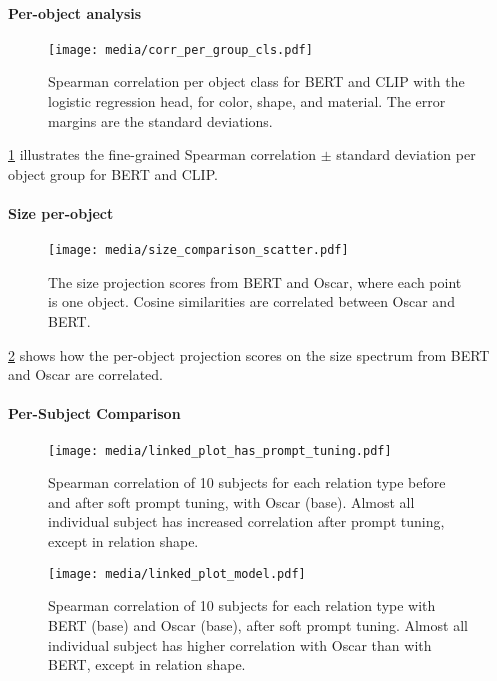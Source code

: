 \documentclass[11pt]{article}
\begin{document}
\paragraph{Per-object analysis}

\begin{figure}[ht]
    \centering
    \texttt{[image: media/corr\_per\_group\_cls.pdf]}
    \caption{Spearman correlation per object class for BERT and CLIP with the logistic regression head, for color, shape, and material. The error margins are the standard deviations.}
    \label{fig:logsitic_reg_fig}
\end{figure}

\cref{fig:logsitic_reg_fig} illustrates the fine-grained Spearman correlation $\pm$ standard deviation per object group for BERT and CLIP.

\paragraph{Size per-object}
\label{sec:size-per-object}

\begin{figure}[h]
    \texttt{[image: media/size\_comparison\_scatter.pdf]}
    \caption{The size projection scores from BERT and Oscar, where each point is one object. Cosine similarities are correlated between Oscar and BERT.}
    \label{fig:size_scatterplot}
\end{figure}

\cref{fig:size_scatterplot} shows how the per-object projection scores on the size spectrum from BERT and Oscar are correlated.


\paragraph{Per-Subject Comparison}
\label{sec:linked-plots}

\begin{figure*}[ht]
    \centering
    \texttt{[image: media/linked\_plot\_has\_prompt\_tuning.pdf]}
    \caption{Spearman correlation of 10 subjects for each relation type before and after soft prompt tuning, with Oscar (base). Almost all individual subject has increased correlation after prompt tuning, except in relation shape.}
    \label{fig:linked_tune_fig}

    \texttt{[image: media/linked\_plot\_model.pdf]}
    \caption{Spearman correlation of 10 subjects for each relation type with BERT (base) and Oscar (base), after soft prompt tuning. Almost all individual subject has higher correlation with Oscar than with BERT, except in relation shape.}
    \label{fig:linked_model_fig}
\end{figure*}
\end{document}
